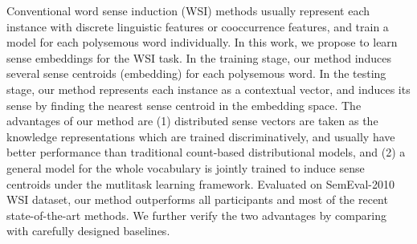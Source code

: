 Conventional word sense induction (WSI) methods usually represent each instance with discrete linguistic features or cooccurrence features, and train a model for each polysemous word individually. In this work, we propose to learn sense embeddings for the WSI task. In the training stage, our method induces several sense centroids (embedding) for each polysemous word. In the testing stage, our method represents each instance as a contextual vector, and induces its sense by finding the nearest sense centroid in the embedding space. The advantages of our method are (1) distributed sense vectors are taken as the knowledge representations which are trained discriminatively, and usually have better performance than traditional count-based distributional models, and (2) a general model for the whole vocabulary is jointly trained to induce sense centroids under the mutlitask learning framework. Evaluated on SemEval-2010 WSI dataset, our method outperforms all participants and most of the recent state-of-the-art methods. We further verify the two advantages by comparing with carefully designed baselines.
